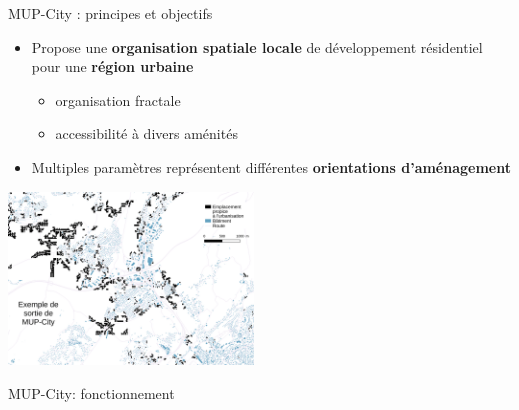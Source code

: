 \documentclass[xcolor=table]{beamer}
\begin{document}
\begin{frame}{MUP-City : principes et objectifs}
	\\
	\begin{itemize}
		\item Propose une \textbf{organisation spatiale locale} de développement résidentiel pour une \textbf{région urbaine}
		\begin{itemize}
			\item<2-> organisation fractale
			\item<3-> accessibilité à divers aménités %
		\end{itemize}
		\item<4> Multiples paramètres représentent différentes \textbf{orientations d'aménagement}
	\end{itemize}
	\includegraphics[width=6.5cm]{Images/ex-sorties-mup.png}
\end{frame}

\begin{frame}{MUP-City: fonctionnement}
	\begin{block}{}\end{block}
\end{frame}
\end{document}
